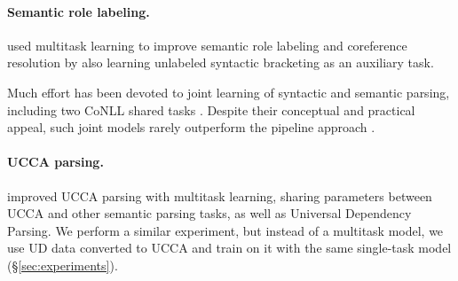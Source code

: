 \documentclass[11pt,a4paper]{article}
\begin{document}
\paragraph{Semantic role labeling.}

 used multitask learning to improve semantic role labeling and coreference resolution
by also learning unlabeled syntactic bracketing as an auxiliary task.

Much effort has been devoted to joint learning of syntactic
and semantic parsing, including
two CoNLL shared tasks \cite{surdeanu2008conll,hajivc2009conll}.
Despite their conceptual and practical appeal, such joint models rarely outperform
the pipeline approach %
\cite{lluis2008joint,henderson2013multilingual,D15-1169,swayamdipta-EtAl:2016:CoNLL,swayamdipta2017frame}.

\paragraph{UCCA parsing.}

 improved UCCA parsing with multitask learning, sharing parameters
between UCCA and other semantic parsing tasks, as well as Universal Dependency Parsing.
We perform a similar experiment, but instead of a multitask model,
we use UD data converted to UCCA and train on it with the same single-task model (\S\ref{sec:experiments}).
%
%




\end{document}
